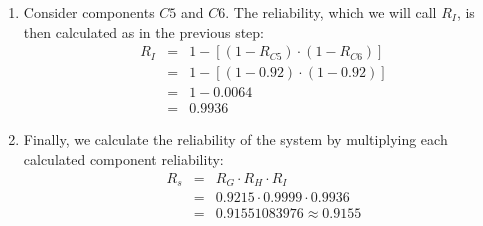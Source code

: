 \begin{examplebox}
\begin{enumerate}
        \item Consider components $C5$ and $C6$. The reliability, which we will call $R_{I}$, is then calculated as in the previous step:
        \begin{equation*}
            \begin{array}{rcl}
                R_{I} &=& 1 - \left[\left(1-R_{C5}\right) \cdot \left(1-R_{C6}\right)\right] \\ [.5em]
                &=& 1 - \left[\left(1 - 0.92\right) \cdot \left(1 - 0.92\right)\right] \\ [.5em]
                &=& 1 - 0.0064 \\ [.5em]
                &=& 0.9936
            \end{array}
        \end{equation*}

        \item Finally, we calculate the reliability of the system by multiplying each calculated component reliability:
        \begin{equation*}
            \begin{array}{rcl}
                R_{s} &=& R_{G} \cdot R_{H} \cdot R_{I} \\ [.5em]
                &=& 0.9215 \cdot 0.9999 \cdot 0.9936 \\ [.5em]
                &=& 0.91551083976 \approx 0.9155
            \end{array}
        \end{equation*}
    \end{enumerate}
\end{examplebox}

